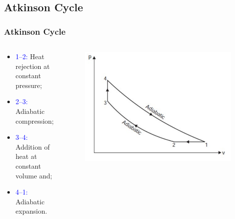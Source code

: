 \documentclass[10pt,compress]{beamer}
\begin{document}
\subsection{Atkinson Cycle}
\begin{frame}
 \frametitle{Atkinson Cycle}
  \begin{columns}
   \begin{column}[c]{0.5\linewidth}
    \begin{itemize}
     \item <1-> \textcolor{blue}{1--2:} Heat rejection at constant pressure;
     \item <2-> \textcolor{blue}{2--3:} Adiabatic compression;
     \item <3-> \textcolor{blue}{3--4:} Addition of heat at constant volume and;
     \item <4-> \textcolor{blue}{4--1:} Adiabatic expansion. 
    \end{itemize}
   \end{column}
   \begin{column}[c]{0.5\linewidth}
    \begin{figure}%
     \begin{center}
      \includegraphics[width=6.cm,clip]{./Pics/InternalCombustion_IdealAtkinsonCombustion}
     \end{center}
    \end{figure}   
   \end{column}  
  \end{columns}
\end{frame}
\end{document}

